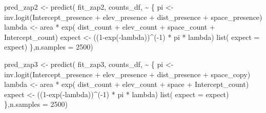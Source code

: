 \documentclass[
  letterpaper,
  DIV=11,
  numbers=noendperiod]{scrartcl}
\newenvironment{Shaded}{\begin{snugshade}}{\end{snugshade}}
\newcommand{\AttributeTok}[1]{\textcolor[rgb]{0.40,0.45,0.13}{#1}}
\newcommand{\DecValTok}[1]{\textcolor[rgb]{0.68,0.00,0.00}{#1}}
\newcommand{\FunctionTok}[1]{\textcolor[rgb]{0.28,0.35,0.67}{#1}}
\newcommand{\NormalTok}[1]{\textcolor[rgb]{0.00,0.23,0.31}{#1}}
\newcommand{\OtherTok}[1]{\textcolor[rgb]{0.00,0.23,0.31}{#1}}
\newcommand{\SpecialCharTok}[1]{\textcolor[rgb]{0.37,0.37,0.37}{#1}}
\begin{document}
\begin{Shaded}
\begin{Highlighting}[]
\NormalTok{pred\_zap2 }\OtherTok{\textless{}{-}} \FunctionTok{predict}\NormalTok{( fit\_zap2, counts\_df,}
  \SpecialCharTok{\textasciitilde{}}\NormalTok{ \{}
\NormalTok{    pi }\OtherTok{\textless{}{-}} \FunctionTok{inv.logit}\NormalTok{(Intercept\_presence }\SpecialCharTok{+}\NormalTok{ elev\_presence }\SpecialCharTok{+}\NormalTok{ dist\_presence }\SpecialCharTok{+}\NormalTok{ space\_presence)}
\NormalTok{    lambda }\OtherTok{\textless{}{-}}\NormalTok{ area }\SpecialCharTok{*} \FunctionTok{exp}\NormalTok{( dist\_count }\SpecialCharTok{+}\NormalTok{ elev\_count }\SpecialCharTok{+}\NormalTok{ space\_count }\SpecialCharTok{+}\NormalTok{ Intercept\_count)}
\NormalTok{    expect }\OtherTok{\textless{}{-}}\NormalTok{ ((}\DecValTok{1}\SpecialCharTok{{-}}\FunctionTok{exp}\NormalTok{(}\SpecialCharTok{{-}}\NormalTok{lambda))}\SpecialCharTok{\^{}}\NormalTok{(}\SpecialCharTok{{-}}\DecValTok{1}\NormalTok{) }\SpecialCharTok{*}\NormalTok{ pi }\SpecialCharTok{*}\NormalTok{ lambda)}
    \FunctionTok{list}\NormalTok{(}
      \AttributeTok{expect =}\NormalTok{ expect)}
\NormalTok{  \},}\AttributeTok{n.samples =} \DecValTok{2500}\NormalTok{)}

\NormalTok{pred\_zap3 }\OtherTok{\textless{}{-}} \FunctionTok{predict}\NormalTok{( fit\_zap3, counts\_df,}
  \SpecialCharTok{\textasciitilde{}}\NormalTok{ \{}
\NormalTok{    pi }\OtherTok{\textless{}{-}} \FunctionTok{inv.logit}\NormalTok{(Intercept\_presence }\SpecialCharTok{+}\NormalTok{ elev\_presence }\SpecialCharTok{+}\NormalTok{ dist\_presence }\SpecialCharTok{+}\NormalTok{ space\_copy)}
\NormalTok{    lambda }\OtherTok{\textless{}{-}}\NormalTok{ area }\SpecialCharTok{*} \FunctionTok{exp}\NormalTok{( dist\_count }\SpecialCharTok{+}\NormalTok{ elev\_count }\SpecialCharTok{+}\NormalTok{ space }\SpecialCharTok{+}\NormalTok{ Intercept\_count)}
\NormalTok{    expect }\OtherTok{\textless{}{-}}\NormalTok{ ((}\DecValTok{1}\SpecialCharTok{{-}}\FunctionTok{exp}\NormalTok{(}\SpecialCharTok{{-}}\NormalTok{lambda))}\SpecialCharTok{\^{}}\NormalTok{(}\SpecialCharTok{{-}}\DecValTok{1}\NormalTok{) }\SpecialCharTok{*}\NormalTok{ pi }\SpecialCharTok{*}\NormalTok{ lambda)}
    \FunctionTok{list}\NormalTok{(}
      \AttributeTok{expect =}\NormalTok{ expect)}
\NormalTok{  \},}\AttributeTok{n.samples =} \DecValTok{2500}\NormalTok{)}





\end{Highlighting}
\end{Shaded}
\end{document}
